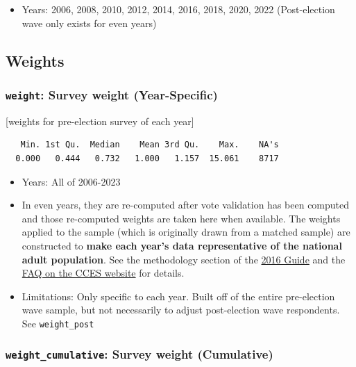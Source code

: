 \documentclass[10pt,article,oneside]{memoir}
\theoremstyle{definition}
\begin{document}
\begin{itemize}
\tightlist
\item
  Years: 2006, 2008, 2010, 2012, 2014, 2016, 2018, 2020, 2022
  (Post-election wave only exists for even years)
\end{itemize}

\subsection{Weights}\label{weights}

\subsubsection{\texorpdfstring{\texttt{weight}: Survey weight
(Year-Specific)}{weight: Survey weight (Year-Specific)}}\label{weight-survey-weight-year-specific}

{[}weights for pre-election survey of each year{]}

\begin{verbatim}
   Min. 1st Qu.  Median    Mean 3rd Qu.    Max.    NA's 
  0.000   0.444   0.732   1.000   1.157  15.061    8717 
\end{verbatim}

\begin{itemize}
\tightlist
\item
  Years: All of 2006-2023
\item
  In even years, they are re-computed after vote validation has been
  computed and those re-computed weights are taken here when available.
  The weights applied to the sample (which is originally drawn from a
  matched sample) are constructed to \textbf{make each year's data
  representative of the national adult population}. See the methodology
  section of the
  \href{https://dataverse.harvard.edu/api/access/datafile/3047286}{2016
  Guide} and the
  \href{https://cces.gov.harvard.edu/frequently-asked-questions}{FAQ on
  the CCES website} for details.
\item
  Limitations: Only specific to each year. Built off of the entire
  pre-election wave sample, but not necessarily to adjust post-election
  wave respondents. See \texttt{weight\_post}
\end{itemize}

\subsubsection{\texorpdfstring{\texttt{weight\_cumulative}: Survey
weight
(Cumulative)}{weight\_cumulative: Survey weight (Cumulative)}}\label{weight_cumulative-survey-weight-cumulative}
\end{document}
